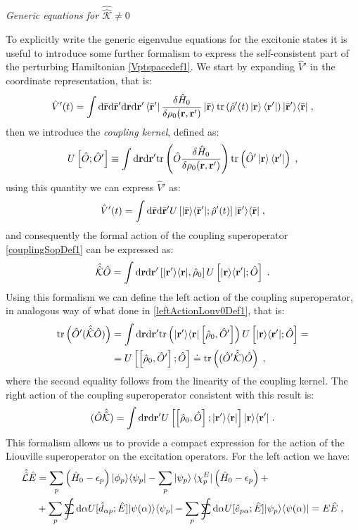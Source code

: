 \documentclass[a4paper]{article}
\newcommand{\dd}{{\rm d}}
\renewcommand{\r}{{\bf r}}
\newcommand{\br}{\bar{\bf r}}
\newcommand{\eps}{\epsilon}
\newcommand{\sint}{\mathrlap{\displaystyle\int}
\mathrlap{\textstyle\sum}
\phantom{\mathrlap{\displaystyle
\int}\textstyle\sum}}
\newcommand{\be}{\begin{equation}}
\newcommand{\ee}{\end{equation}}
\newcommand{\nn}{\notag}
\newcommand{\lb}{\label}
\newcommand{\op}[1]{\hat {#1}}
\newcommand{\sop}[1]{\op{\op {#1}}}
\newcommand{\commutator}[2]{\left[ {#1} , {#2} \right]}
\newcommand{\trace}[1]{\mathrm{tr}\left(#1\right)}
\newcommand{\ketbra}[2]{| #1 \rangle \langle #2 |}
\newcommand{\dmnot}{\op{\rho}_0}
\newcommand{\dm}{\op{\rho}}
\newcommand{\hnot}{\op{H}_0}
\newcommand{\excite}[2]{\op e_{{#1}{#2}}}
\newcommand{\decay}[2]{\op d_{{#1}{#2}}}
\newcommand{\Liouv}{\sop{\mathcal L}}
\newcommand{\coupl}{\sop{\mathcal K}}
\begin{document}
\vspace{0.5cm}
\emph{Generic equations for $\coupl \neq 0$}
\vspace{0.5cm}

To explicitly write the generic eigenvalue equations for the excitonic states it is useful to introduce some further formalism to express the 
self-consistent part of the perturbing Hamiltonian \eqref{Vptspacedef1}. We start by expanding $\op V'$ in the coordinate representation, that is:
\be
\op V'(t)= 
\int \dd \br \dd \br' \dd \r \dd \r' \bra{\br'}\frac{\delta\hnot}{\delta \rho_0(\r,\r')}\ket{\br}
\trace{\dm'(t) \ket{\r} \bra{\r'}} \ketbra{\br'}{\br}\;, \nn
\ee
then we introduce the \emph{coupling kernel}, defined as:
\be\lb{couplingKernelDef1}
U\left[\op O; \op O'\right] \equiv  \int \dd \r \dd \r' \trace{\op O \frac{\delta \hnot }{\delta \rho_0(\r,\r')}
} \trace{\op O' \ket{\r} \bra{\r'}} \;,
\ee
using this quantity we can express $\op V'$ as:
\be\lb{Vptspacedef2}
\op V'(t)= 
\int \dd \br \dd \br' U\left[\ketbra{\br}{\br'};\dm'(t)\right] \ketbra{\br'}{\br}\;,
\ee
and consequently the formal action of the coupling superoperator \eqref{couplingSopDef1} can be expressed as: 
\be\lb{couplingSopDef2}
\coupl\op O = 
\int \dd \r \dd \r' \commutator{\ketbra{\r'}{\r}}{\dmnot} U\left[\ketbra{\r}{\r'};\op O\right] \;.
\ee
Using this formalism we can define the left action of the coupling superoperator, in analogous way of what done in \eqref{leftActionLouv0Def1}, 
that is:
\begin{align}\lb{leftActionCouplingDef1}
\trace{\op O' (\coupl \op O)} &= \int \dd\r\dd\r'\trace{\ketbra{\r'}{\r}\commutator{\dmnot}{\op O'}}
U\left[\ketbra{\r}{\r'};\op O\right]  = \nn \\ &= 
U\left[\commutator{\dmnot}{\op O'};\op O\right] \doteq \trace{(\op O' \coupl) \op O } \;,
\end{align}
where the second equality follows from the linearity of the coupling kernel. The right action of the coupling superoperator consistent with this result is:
\be\lb{leftActionCouplingDef2}
(\op O \coupl) = \int \dd\r\dd\r'
U\left[\commutator{\dmnot}{\op O};\ketbra{\r'}{\r}\right]\ketbra{\r}{\r'} \;.
\ee
This formalism allows us to provide a compact expression for the action of the Liouville superoperator on the excitation operators. For the left action we have:
\begin{align}
\Liouv\op E &= \sum_p\left(\hnot-\eps_p\right)\ketbra{\phi_p}{\psi_p} - \sum_p\ket{\psi_p} \bra{\chi^E_p}\left(\hnot-\eps_p\right) + \nn \\
&+ \sum_p \sint \dd\alpha  U[\decay{\alpha}{p}; \op E] \ketbra{\psi(\alpha)}{\psi_p}
- \sum_p \sint \dd\alpha U[\excite{p}{\alpha}; \op E] \ketbra{\psi_p}{\psi(\alpha)} = E\op E \;,
\end{align}
\end{document}
